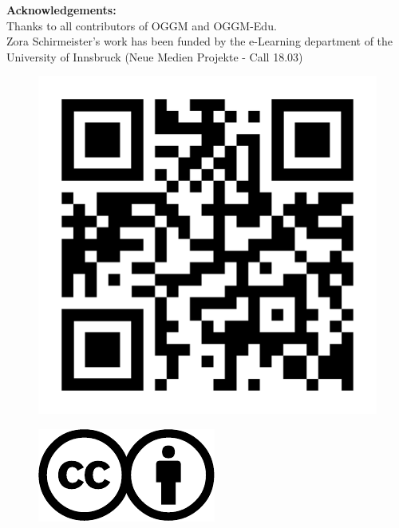 \documentclass[final]{beamer}
\begin{document}
\begin{frame}[fragile]
\begin{footnotesize}
\begin{minipage}[t]{0.75\textwidth}
		\textbf{Acknowledgements:} \\
		Thanks to all contributors of OGGM and OGGM-Edu.
		\\ Zora Schirmeister's work has been funded by the e-Learning department of the University of Innsbruck (Neue Medien Projekte - Call 18.03)
	\end{minipage}
	\hspace{6cm}
	\begin{minipage}[t]{0.1\textwidth}
		\begin{figure}
			\includegraphics[width=\textwidth]{qr-code}
		\end{figure}
	\end{minipage}
	\begin{minipage}[t]{0.05\textwidth}
		\begin{figure}
			\includegraphics[width=\textwidth]{license_ccby}
		\end{figure}
	\end{minipage}
\end{footnotesize}
\end{frame}
\end{document}
